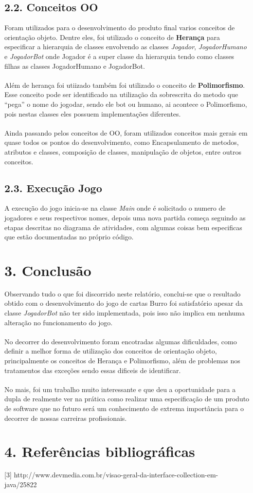 \documentclass[12pt, a4paper]{article}
\begin{document}
   \subsection*{2.2. Conceitos OO}
    Foram utilizados para o desenvolvimento do produto final varios conceitos de orientação objeto.
    Dentre eles, foi utilizado o conceito de \textbf{Herança} para especificar a hierarquia de classes envolvendo as classes
    \textit{Jogador}, \textit{JogadorHumano} e \textit{JogadorBot} onde Jogador é a super classe da hierarquia tendo como classes filhas as classes
    JogadorHumano e JogadorBot. \\\\
    Além de herança foi utiizado também foi utilizado o conceito de \textbf{Polimorfismo}. Esse conceito pode ser identificado na utilização da
    sobrescrita do metodo que ``pega'' o nome do jogodar, sendo ele bot ou humano, ai acontece o Polimorfismo, pois nestas classes eles possuem
    implementações diferentes.\\\\
    Ainda passando pelos conceitos de OO, foram utilizados conceitos mais gerais em quase todos os pontos do desenvolvimento, como Encapsulamento de
    metodos, atributos e classes, composição de classes, manipulação de objetos, entre outros conceitos.

   \subsection*{2.3. Execução Jogo}
    A execução do jogo inicia-se na classe \textit{Main} onde é solicitado o numero de jogadores e seus respectivos nomes, depois uma nova
    partida começa seguindo as etapas descritas no diagrama de atividades, com algumas coisas bem especificas que estão documentadas no próprio código.

\section*{3. Conclusão}
  Observando tudo o que foi discorrido neste relatório, conclui-se que o resultado obtido com o desenvolvimento do jogo
  de cartas Burro foi satisfatório apesar da classe \textit{JogadorBot} não ter sido implementada,
  pois isso não implica em nenhuma alteração no funcionamento do jogo.
  \\\\
  No decorrer do desenvolvimento foram encotradas algumas dificuldades, como definir a melhor forma de utilização
  dos conceitos de orientação objeto, principalmente os conceitos de Herança e Polimorfismo, além de problemas
  nos tratamentos das exceções sendo essas dificeis de identificar.
  \\\\
  No mais, foi um trabalho muito interessante e que deu a oportunidade para a dupla de realmente ver na prática
  como realizar uma especificação de um produto de software que no futuro será um conhecimento de extrema importância
  para o decorrer de nossas carreiras profissionais.

\section*{4. Referências bibliográficas}
[3] http://www.devmedia.com.br/visao-geral-da-interface-collection-em-java/25822
\end{document}
